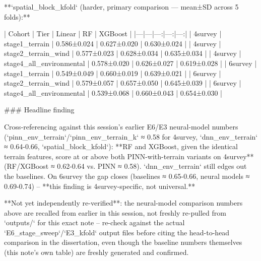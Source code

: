 **`spatial_block_kfold` (harder, primary comparison — mean±SD across 5 folds):**

| Cohort | Tier | Linear | RF | XGBoost |
|---|---|---:|---:|---:|
| 4survey | stage1_terrain | 0.586±0.024 | 0.627±0.020 | 0.630±0.024 |
| 4survey | stage2_terrain_wind | 0.577±0.023 | 0.628±0.034 | 0.635±0.034 |
| 4survey | stage4_all_environmental | 0.578±0.020 | 0.626±0.027 | 0.619±0.028 |
| 6survey | stage1_terrain | 0.549±0.049 | 0.660±0.019 | 0.639±0.021 |
| 6survey | stage2_terrain_wind | 0.579±0.057 | 0.657±0.050 | 0.645±0.039 |
| 6survey | stage4_all_environmental | 0.539±0.068 | 0.660±0.043 | 0.654±0.030 |

### Headline finding

Cross-referencing against this session's earlier E6/E3 neural-model numbers
(`pinn_env_terrain`/`pinn_env_terrain_k` ≈ 0.58 for 4survey, `dnn_env_terrain` ≈ 0.64-0.66,
`spatial_block_kfold`): **RF and XGBoost, given the identical terrain features, score at or above
both PINN-with-terrain variants on 4survey** (RF/XGBoost ≈ 0.62-0.64 vs. PINN ≈ 0.58).
`dnn_env_terrain` still edges out the baselines. On 6survey the gap closes (baselines ≈ 0.65-0.66,
neural models ≈ 0.69-0.74) -- **this finding is 4survey-specific, not universal.**

**Not yet independently re-verified**: the neural-model comparison numbers above are recalled
from earlier in this session, not freshly re-pulled from `outputs/` for this exact note --
re-check against the actual `E6_stage_sweep`/`E3_kfold` output files before citing the
head-to-head comparison in the dissertation, even though the baseline numbers themselves
(this note's own table) are freshly generated and confirmed.
